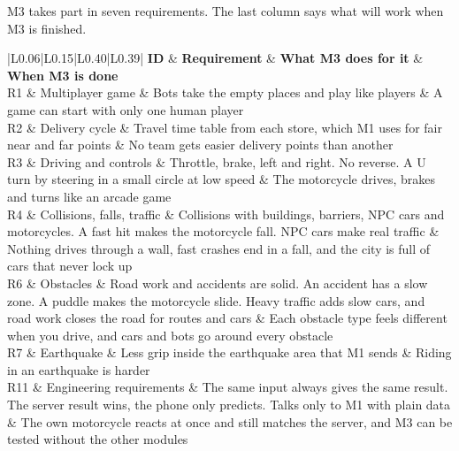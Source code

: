 \documentclass[
  english,
  10pt,
  a4paper,
]{article}
\newcommand{\ckkeep}[1]{\par\noindent\begin{minipage}{\linewidth}\setlength{\parskip}{4pt}#1\end{minipage}\par\smallskip}
\begin{document}
\ckkeep{%
M3 takes part in seven requirements. The last column says what will work when M3 is finished.

\begin{tabular}{|L{0.06}|L{0.15}|L{0.40}|L{0.39}|}
\hline \textbf{ID} & \textbf{Requirement} & \textbf{What M3 does for it} & \textbf{When M3 is done} \\ \hline 
R1 & Multiplayer game & Bots take the empty places and play like players & A game can start with only one human player \\ \hline
R2 & Delivery cycle & Travel time table from each store, which M1 uses for fair near and far points & No team gets easier delivery points than another \\ \hline
R3 & Driving and controls & Throttle, brake, left and right. No reverse. A U turn by steering in a small circle at low speed & The motorcycle drives, brakes and turns like an arcade game \\ \hline
R4 & Collisions, falls, traffic & Collisions with buildings, barriers, NPC cars and motorcycles. A fast hit makes the motorcycle fall. NPC cars make real traffic & Nothing drives through a wall, fast crashes end in a fall, and the city is full of cars that never lock up \\ \hline
R6 & Obstacles & Road work and accidents are solid. An accident has a slow zone. A puddle makes the motorcycle slide. Heavy traffic adds slow cars, and road work closes the road for routes and cars & Each obstacle type feels different when you drive, and cars and bots go around every obstacle \\ \hline
R7 & Earthquake & Less grip inside the earthquake area that M1 sends & Riding in an earthquake is harder \\ \hline
R11 & Engineering requirements & The same input always gives the same result. The server result wins, the phone only predicts. Talks only to M1 with plain data & The own motorcycle reacts at once and still matches the server, and M3 can be tested without the other modules \\ \hline
\end{tabular}}

\end{document}
